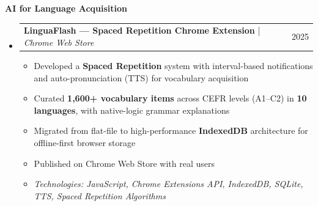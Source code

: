 \documentclass[11pt,a4paper]{article}
\makeatletter
\newcommand{\subspace}{\vspace{0.5em}}
\newcommand{\cvsubsection}[1]{
    \subspace
    \noindent\textcolor{primary}{\large \textbf{#1}}
    \par\vspace{0.3em}
}
\newcommand{\headerrow}[2]{
    \begin{tabular*}{\linewidth}{l@{\extracolsep{\fill}}r}
    #1 & \textcolor{primary}{#2} \\
    \end{tabular*}
}
\makeatother
\begin{document}
\cvsubsection{AI for Language Acquisition}
\begin{itemize}[leftmargin=1em, label={}]
    \item
    \headerrow{\textbf{LinguaFlash — Spaced Repetition Chrome Extension} | \emph{Chrome Web Store}}{2025}
    \begin{itemize}[leftmargin=1.5em, label=$\bullet$, nosep]
        \item Developed a \textbf{Spaced Repetition} system with interval-based notifications and auto-pronunciation (TTS) for vocabulary acquisition
        \item Curated \textbf{1,600+ vocabulary items} across CEFR levels (A1--C2) in \textbf{10 languages}, with native-logic grammar explanations
        \item Migrated from flat-file to high-performance \textbf{IndexedDB} architecture for offline-first browser storage
        \item Published on Chrome Web Store with real users
        \item \emph{Technologies: JavaScript, Chrome Extensions API, IndexedDB, SQLite, TTS, Spaced Repetition Algorithms}
    \end{itemize}
\end{itemize}
\end{document}

